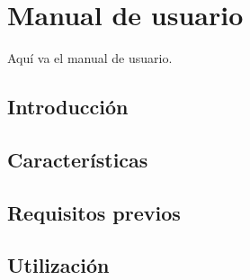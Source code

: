 \chapter{Manual de usuario}
Aquí va el manual de usuario.

\section{Introducción}

\section{Características}

\section{Requisitos previos}

\section{Utilización}